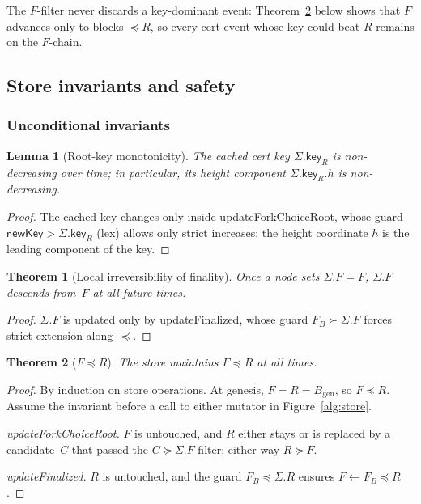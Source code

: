 \documentclass{article}
\newcommand{\genesis}{\ensuremath{B_{\mathrm{gen}}}}
\newcommand{\key}{\mathsf{key}}
\newcommand{\newKey}{\mathsf{newKey}}
\newcommand{\updateForkChoiceRoot}{\textsf{updateForkChoiceRoot}\xspace}
\newcommand{\updateFinalized}{\textsf{updateFinalized}\xspace}
\theoremstyle{plain}
\newtheorem{theorem}{Theorem}
\newtheorem{lemma}{Lemma}
\theoremstyle{definition}
\theoremstyle{remark}
\begin{document}
The $F$-filter never discards a key-dominant event: Theorem~\ref{thm:fleqr} below shows that $F$ advances only to blocks $\preceq R$, so every cert event whose key could beat $R$ remains on the $F$-chain.

\subsection{Store invariants and safety}

\subsubsection*{Unconditional invariants}

\begin{lemma}[Root-key monotonicity]\label{lem:Rs-key-monotone}
The cached cert key $\Sigma.\key_R$ is non-decreasing over time; in particular, its height component $\Sigma.\key_R.h$ is non-decreasing.
\end{lemma}

\begin{proof}
The cached key changes only inside \updateForkChoiceRoot, whose guard $\newKey > \Sigma.\key_R$ (lex) allows only strict increases; the height coordinate $h$ is the leading component of the key.
\end{proof}

\begin{theorem}[Local irreversibility of finality]\label{thm:finperm}
Once a node sets $\Sigma.F = F$, $\Sigma.F$ descends from~$F$ at all future times.
\end{theorem}

\begin{proof}
$\Sigma.F$ is updated only by \updateFinalized, whose guard $F_B \succ \Sigma.F$ forces strict extension along~$\preceq$.
\end{proof}

\begin{theorem}[$F \preceq R$]\label{thm:fleqr}
The store maintains $F \preceq R$ at all times.
\end{theorem}

\begin{proof}
By induction on store operations.
At genesis, $F = R = \genesis$, so $F \preceq R$.
Assume the invariant before a call to either mutator in Figure~\ref{alg:store}.

\emph{\updateForkChoiceRoot.}
$F$ is untouched, and $R$ either stays or is replaced by a candidate~$C$ that passed the $C \succeq \Sigma.F$ filter; either way $R \succeq F$.

\emph{\updateFinalized.}
$R$ is untouched, and the guard $F_B \preceq \Sigma.R$ ensures $F \gets F_B \preceq R$.
\end{proof}
\end{document}
